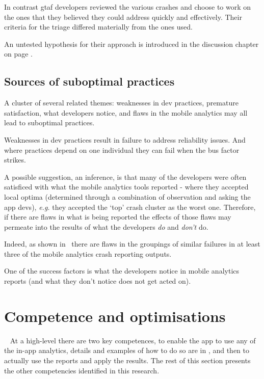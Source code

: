 In contrast \Gls{gtaf} developers reviewed the various crashes and choose to work on the ones that they believed they could address quickly and effectively. Their criteria for the triage differed materially from the ones  used.

An untested hypothesis for their approach is introduced in the discussion chapter on page \pageref{discussion-decision-making-by-dev-teams-section}.

\subsection{Sources of suboptimal practices}
A cluster of several related themes: weaknesses in dev practices, premature satisfaction, what developers notice, and flaws in the mobile analytics may all lead to suboptimal practices.

Weaknesses in dev practices result in failure to address reliability issues. And where practices depend on one individual they can fail when the bus factor strikes. 

A possible suggestion, an inference, is that many of the developers were often satisficed with what the mobile analytics tools reported - where they accepted local optima (determined through a combination of observation and asking the app devs), \textit{e.g.} they accepted the `top' crash cluster as the worst one. Therefore, if there are flaws in what is being reported the effects of those flaws may permeate into the results of what the developers \textit{do} and \textit{don't} do.

Indeed, as shown in~ there are flaws in the groupings of similar failures in at least three of the mobile analytics crash reporting outputs.

One of the success factors is what the developers notice in mobile analytics reports (and what they don't notice does not get acted on).


\section{Competence and optimisations}~\label{aiu-competence-and-optimisations-section}
At a high-level there are two key competences, to enable the app to use any of the in-app analytics, details and examples of how to do so are in , and then to actually use the reports and apply the results. The rest of this section presents the other competencies identified in this research.

